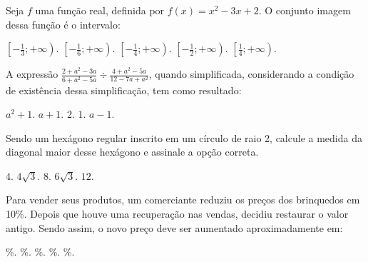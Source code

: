 \begin{question}%
Seja \(f\) uma função real, definida por \(f(x) = x^2 - 3x +2\). O conjunto imagem dessa função é o intervalo:
    \begin{tasks}
        \task \(\left[ -\frac{1}{3}; + \infty \right)\).
        \task \(\left[ -\frac{1}{6}; + \infty \right)\).
        \task \(\left[ -\frac{1}{4}; + \infty \right)\).
        \task \(\left[ -\frac{1}{2}; + \infty \right)\).
        \task \(\left[ \frac{1}{4}; + \infty \right)\).
    \end{tasks}
\end{question}

\begin{question}%
A expressão \(\frac{2+a^2-3a}{6+a^2-5a} \div \frac{4+a^2-5a}{12-7a+a^2}\), quando simplificada, considerando a condição de existência dessa simplificação, tem como resultado:
    \begin{tasks}
        \task \( a^2 + 1\).
        \task \( a+1\).
        \task \( 2\).
        \task \( 1\).
        \task \( a-1\).
    \end{tasks}
\end{question}

\begin{question}%
Sendo um hexágono regular inscrito em um círculo de raio 2, calcule a medida da diagonal maior desse hexágono e assinale a opção correta.
    \begin{tasks}
        \task \(4\).
        \task \(4\sqrt{3}\).
        \task \(8\).
        \task \(6\sqrt{3}\).
        \task \(12\).
    \end{tasks}
\end{question}

\begin{question}%
Para vender seus produtos, um comerciante reduziu os preços dos brinquedos em 10\%. Depois que houve uma recuperação nas vendas, decidiu restaurar o valor antigo. Sendo assim, o novo preço deve ser aumentado aproximadamente em:
    \begin{tasks}
        \%.
        \%.
        \%.
        \%.
        \%.
    \end{tasks}
\end{question}

